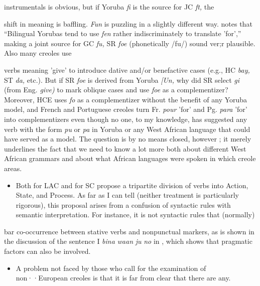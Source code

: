 instrumentals is obvious, but if Yoruba \textit{fi} is the source for JC \textit{ft,} the

shift in meaning is baffling. \textit{Fun} is puzzling in a slightly different way. \citet{Rowlands1969} notes that ``Bilingual Yorubas tend to use \textit{fen} rather indiscriminately to translate 'for','' making a joint source for GC \textit{fu,} SR \textit{foe }(phonetically /fu/) sound ver;r plausible. Also many creoles use


verbs meaning 'give' to introduce dative and/or benefactive cases (e.g., HC \textit{bay,} ST \textit{da,} etc.). But if SR \textit{foe} is derived from Yoruba \textit{[Un,} why did SR select \textit{gi} (from Eng. \textit{give}\textit{)} to mark oblique cases and use \textit{foe} as a complementizer? Moreover, HCE uses \textit{fo} as a complementizer without the benefit of any Yoruba model, and French and Portuguese creoles turn Fr. \textit{pour} 'for' and Pg. \textit{para} 'for' into complementizers even though no one, to my knowledge, has suggested any verb with the form \textit{pu} or \textit{pa} in Yoruba or any West African language that could have served as a model. The question is by no means closed, however ; it merely underlines the fact that we need to know a lot more both about different West African grammars and about what African lan\-guages were spoken in which creole areas.

\begin{itemize}
\item Both \citet{Christie1976} for LAC and \citet{Corne1981} for SC propose a tripartite division of verbs into Action, State, and Process. As far as I can tell (neither treatment is particularly rigorous), this proposal arises from a confusion of syntactic rules with semantic interpretation. For instance, it is not syntactic rules that (normally)
\end{itemize}

bar co-occurrence between stative verbs and nonpunctual markers, as is shown in the discussion of the sentence I \textit{bina} \textit{waan} \textit{ju} \textit{no} in \citet[38]{Bickerton1975}, which shows that pragmatic factors can also be involved.

\begin{itemize}
\item A problem not faced by those who call for the examination of non··European creoles is that it is far from clear that there are any.
\end{itemize}

